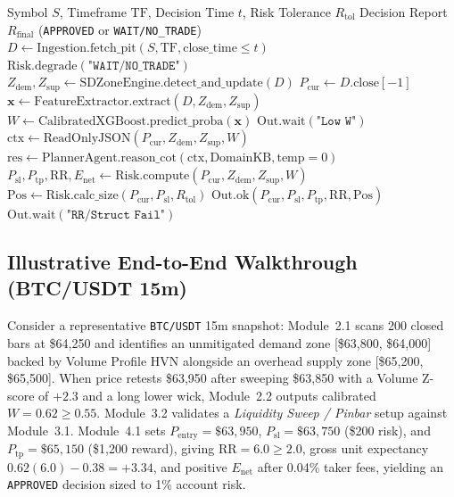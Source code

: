 \documentclass[conference]{IEEEtran}
\begin{document}
\begin{algorithm}[t]
\caption{Hybrid TPA-Agent Decision Pipeline}
\label{alg:tpa}
\begin{algorithmic}[1]
\REQUIRE Symbol $S$, Timeframe $\mathrm{TF}$, Decision Time $t$, Risk Tolerance $R_{\text{tol}}$
\ENSURE Decision Report $R_{\text{final}}$ (\texttt{APPROVED} or \texttt{WAIT/NO\_TRADE})
\STATE $D \leftarrow \text{Ingestion.fetch\_pit}(S, \mathrm{TF}, \text{close\_time} \le t)$
    \RETURN $\text{Risk.degrade}(\texttt{"WAIT/NO\_TRADE"})$
\ENDIF
\STATE $Z_{\text{dem}}, Z_{\text{sup}} \leftarrow \text{SDZoneEngine.detect\_and\_update}(D)$
\STATE $P_{\text{cur}} \leftarrow D.\text{close}[-1]$
\STATE $\mathbf{x} \leftarrow \text{FeatureExtractor.extract}(D, Z_{\text{dem}}, Z_{\text{sup}})$
\STATE $W \leftarrow \text{CalibratedXGBoost.predict\_proba}(\mathbf{x})$
    \RETURN $\text{Out.wait}(\texttt{"Low W"})$
\ENDIF
\STATE $\text{ctx} \leftarrow \text{ReadOnlyJSON}(P_{\text{cur}}, Z_{\text{dem}}, Z_{\text{sup}}, W)$
\STATE $\text{res} \leftarrow \text{PlannerAgent.reason\_cot}(\text{ctx}, \text{DomainKB}, \text{temp}=0)$
\STATE $P_{\text{sl}}, P_{\text{tp}}, \mathrm{RR}, E_{\text{net}} \leftarrow \text{Risk.compute}(P_{\text{cur}}, Z_{\text{dem}}, Z_{\text{sup}}, W)$
    \STATE $\mathrm{Pos} \leftarrow \text{Risk.calc\_size}(P_{\text{cur}}, P_{\text{sl}}, R_{\text{tol}})$
    \RETURN $\text{Out.ok}(P_{\text{cur}}, P_{\text{sl}}, P_{\text{tp}}, \mathrm{RR}, \mathrm{Pos})$
\ELSE
    \RETURN $\text{Out.wait}(\texttt{"RR/Struct Fail"})$
\ENDIF
\end{algorithmic}
\end{algorithm}

\subsection{Illustrative End-to-End Walkthrough (BTC/USDT 15m)}
Consider a representative \texttt{BTC/USDT} 15m snapshot: Module~2.1 scans 200 closed bars at \$64,250 and identifies an unmitigated demand zone [\$63,800, \$64,000] backed by Volume Profile HVN alongside an overhead supply zone [\$65,200, \$65,500]. When price retests \$63,950 after sweeping \$63,850 with a Volume Z-score of $+2.3$ and a long lower wick, Module~2.2 outputs calibrated $W = 0.62 \ge 0.55$. Module~3.2 validates a \textit{Liquidity Sweep / Pinbar} setup against Module~3.1. Module~4.1 sets $P_{\text{entry}} = \$63{,}950$, $P_{\text{sl}} = \$63{,}750$ (\$200 risk), and $P_{\text{tp}} = \$65{,}150$ (\$1,200 reward), giving $\mathrm{RR} = 6.0 \ge 2.0$, gross unit expectancy $0.62(6.0)-0.38 = +3.34$, and positive $E_{\text{net}}$ after 0.04\% taker fees, yielding an \texttt{APPROVED} decision sized to 1\% account risk.
\end{document}
